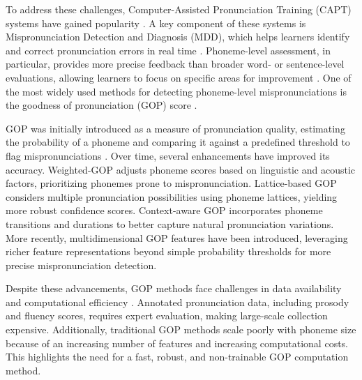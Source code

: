 \documentclass{Interspeech}
\begin{document}
To address these challenges, Computer-Assisted Pronunciation Training (CAPT) systems have gained popularity \cite{hsu2024examination,Amrate2024ComputerassistedPT}. A key component of these systems is Mispronunciation Detection and Diagnosis (MDD), which helps learners identify and correct pronunciation errors in real time \cite{alrashoudi2025improving}. Phoneme-level assessment, in particular, provides more precise feedback than broader word- or sentence-level evaluations, allowing learners to focus on specific areas for improvement \cite{cao2024framework}. One of the most widely used methods for detecting phoneme-level mispronunciations is the goodness of pronunciation (GOP) score \cite{witt2000use}.


GOP was initially introduced as a measure of pronunciation quality, estimating the probability of a phoneme and comparing it against a predefined threshold to flag mispronunciations \cite{kanters2009goodness}. Over time, several enhancements have improved its accuracy. Weighted-GOP \cite{doremalen10_interspeech} adjusts phoneme scores based on linguistic and acoustic factors, prioritizing phonemes prone to mispronunciation. Lattice-based GOP \cite{5451809} considers multiple pronunciation possibilities using phoneme lattices, yielding more robust confidence scores. Context-aware GOP \cite{shi2020context} incorporates phoneme transitions and durations to better capture natural pronunciation variations. More recently, multidimensional GOP features \cite{do2024acoustic,cao2024framework,gong_gopt} have been introduced, leveraging richer feature representations beyond simple probability thresholds for more precise mispronunciation detection. 

Despite these advancements, GOP methods face challenges in data availability and computational efficiency \cite{elkheir2023mispronunciation}. Annotated pronunciation data, including prosody and fluency scores, requires expert evaluation, making large-scale collection expensive. Additionally, traditional GOP methods scale poorly with phoneme size because of an increasing number of features and increasing computational costs. This highlights the need for a fast, robust, and non-trainable GOP computation method.
\end{document}
